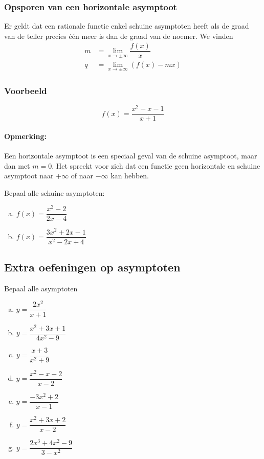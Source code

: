 \documentclass[12pt,twoside,a4paper]{article}
\begin{document}
\subsubsection*{Opsporen van een horizontale asymptoot}

Er geldt dat een rationale functie enkel schuine asymptoten heeft als de graad van de teller precies één meer is dan de graad van de noemer. We vinden
\begin{align*}
  m&=\lim_{x\to\pm\infty}\dfrac{f(x)}{x}\\
  q&=\lim_{x\to\pm\infty}\left(f(x)-mx\right)
\end{align*}

\subsubsection*{Voorbeeld}
$$f(x)=\dfrac{x^2-x-1}{x+1}$$

\paragraph*{Opmerking:} Een horizontale asymptoot is een speciaal geval van de schuine asymptoot, maar dan met $m=0$. Het spreekt voor zich dat een functie geen horizontale en schuine asymptoot naar $+\infty$ of naar $-\infty$ kan hebben.

\begin{oefening}
Bepaal alle schuine asymptoten:
\begin{enumerate}[(a)]
  \itemsep.5em
  \item $f(x)=\dfrac{x^2-2}{2x-4}$
  \item $f(x)=\dfrac{3x^2+2x-1}{x^2-2x+4}$
\end{enumerate}
\end{oefening}

\needspace{3cm}
\subsection{Extra oefeningen op asymptoten}

\begin{oefening} %
Bepaal alle asymptoten\\
\begin{multicols}{2}
\begin{enumerate}[(a)]
  \itemsep1em
  \item $\displaystyle y=\dfrac{2x^2}{x+1}$
  \item $\displaystyle y=\dfrac{x^2+3x+1}{4x^2-9}$
  \item $\displaystyle y=\dfrac{x+3}{x^2+9}$
  \item $\displaystyle y=\dfrac{x^2-x-2}{x-2}$
  \item $\displaystyle y=\dfrac{-3x^2+2}{x-1}$
  \item $\displaystyle y=\dfrac{x^2+3x+2}{x-2}$
  \item $\displaystyle y=\dfrac{2x^3+4x^2-9}{3-x^2}$
\end{enumerate}
\end{multicols}
\end{oefening}
\end{document}
